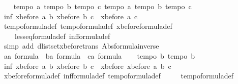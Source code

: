 \begin{isabellebody}
\ \ \isamarkupfalse%
\ {\isachardoublequoteopen}tempo{}\ a{\isachardoublequoteclose}\ {\isachardoublequoteopen}tempo{}\ b{\isachardoublequoteclose}\ {\isachardoublequoteopen}tempo{}\ c{\isachardoublequoteclose}\ {\isachardoublequoteopen}tempo{}\ a{\isachardoublequoteclose}\ {\isachardoublequoteopen}tempo{}\ b{\isachardoublequoteclose}\ {\isachardoublequoteopen}tempo{}\ c{\isachardoublequoteclose}\isanewline
\ \ \isamarkupfalse%
\ {\isachardoublequoteopen}inf\ {\isacharparenleft}xbefore\ a\ b{\isacharparenright}\ {\isacharparenleft}xbefore\ b\ c{\isacharparenright}\ {\isasymle}\ xbefore\ a\ c{\isachardoublequoteclose}\isanewline
\ \ \isamarkupfalse%
\ tempo{}{\isacharunderscore}formula{\isacharunderscore}def\ tempo{}{\isacharunderscore}formula{\isacharunderscore}def\ xbefore{\isacharunderscore}formula{\isacharunderscore}def\ \isanewline
\ \ \ \ less{\isacharunderscore}eq{\isacharunderscore}formula{\isacharunderscore}def\ inf{\isacharunderscore}formula{\isacharunderscore}def\isanewline
\ \ \isamarkupfalse%
\ {\isacharparenleft}simp\ add{\isacharcolon}\ dlistset{\isacharunderscore}xbefore{\isacharunderscore}trans\ Abs{\isacharunderscore}formula{\isacharunderscore}inverse{\isacharparenright}\isanewline
\ \ \isamarkupfalse%
\isanewline
\ \ \isamarkupfalse%
\ a{\isacharcolon}{\isacharcolon}{\isachardoublequoteopen}{\isacharprime}a\ formula{\isachardoublequoteclose}\ \ b{\isacharcolon}{\isacharcolon}{\isachardoublequoteopen}{\isacharprime}a\ formula{\isachardoublequoteclose}\ \ c{\isacharcolon}{\isacharcolon}{\isachardoublequoteopen}{\isacharprime}a\ formula{\isachardoublequoteclose}\isanewline
\ \ \isamarkupfalse%
\ {\isachardoublequoteopen}tempo{}\ b{\isachardoublequoteclose}\ {\isachardoublequoteopen}tempo{}\ b{\isachardoublequoteclose}\isanewline
\ \ \isamarkupfalse%
\ {\isachardoublequoteopen}inf\ {\isacharparenleft}xbefore\ a\ b{\isacharparenright}\ {\isacharparenleft}xbefore\ b\ c{\isacharparenright}\ {\isacharequal}\ xbefore\ {\isacharparenleft}xbefore\ a\ b{\isacharparenright}\ c{\isachardoublequoteclose}\isanewline
\ \ \isamarkupfalse%
\ xbefore{\isacharunderscore}formula{\isacharunderscore}def\ inf{\isacharunderscore}formula{\isacharunderscore}def\ tempo{}{\isacharunderscore}formula{\isacharunderscore}def\ \isanewline
\ \ \ \ tempo{}{\isacharunderscore}formula{\isacharunderscore}def\isanewline

\end{isabellebody}
